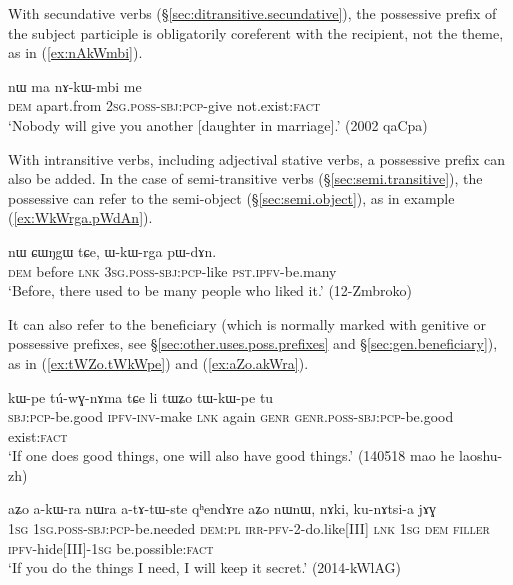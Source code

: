 With secundative verbs (§\ref{sec:ditransitive.secundative}), the possessive prefix of the subject participle is obligatorily coreferent with the recipient, not the theme, as in (\ref{ex:nAkWmbi}).

\begin{exe}
\ex \label{ex:nAkWmbi}
\gll nɯ ma nɤ-kɯ-mbi me \\
\textsc{dem} apart.from \textsc{2sg}.\textsc{poss}-\textsc{sbj}:\textsc{pcp}-give not.exist:\textsc{fact} \\
\glt `Nobody will give you another [daughter in marriage].' (2002 qaCpa)
\end{exe}
With intransitive verbs, including adjectival stative verbs, a possessive prefix can also be added. In the case of semi-transitive verbs (§\ref{sec:semi.transitive}), the possessive can refer to the semi-object (§\ref{sec:semi.object}), as in example (\ref{ex:WkWrga.pWdAn}).

 \begin{exe} 
\ex \label{ex:WkWrga.pWdAn}
\gll  nɯ ɕɯŋgɯ tɕe, ɯ-kɯ-rga pɯ-dɤn. \\
\textsc{dem} before \textsc{lnk} \textsc{3sg}.\textsc{poss}-\textsc{sbj}:\textsc{pcp}-like \textsc{pst}.\textsc{ipfv}-be.many \\
\glt  `Before, there used to be many people who liked it.' (12-Zmbroko)
\end{exe}

It can also refer to the beneficiary (which is normally marked with genitive or possessive prefixes, see §\ref{sec:other.uses.poss.prefixes} and §\ref{sec:gen.beneficiary}), as in (\ref{ex:tWZo.tWkWpe}) and (\ref{ex:aZo.akWra}).

 \begin{exe} 
\ex \label{ex:tWZo.tWkWpe}
\gll  kɯ-pe tú-wɣ-nɤma tɕe li tɯʑo tɯ-kɯ-pe tu \\
\textsc{sbj}:\textsc{pcp}-be.good \textsc{ipfv}-\textsc{inv}-make \textsc{lnk} again \textsc{genr} \textsc{genr}.\textsc{poss}-\textsc{sbj}:\textsc{pcp}-be.good exist:\textsc{fact} \\
\glt  `If one does good things, one will also have good things.' (140518 mao he laoshu-zh)
\end{exe}

 \begin{exe} 
\ex \label{ex:aZo.akWra}
\gll  aʑo a-kɯ-ra nɯra a-tɤ-tɯ-ste qʰendɤre aʑo nɯnɯ, nɤki, ku-nɤtsi-a jɤɣ \\
\textsc{1sg} \textsc{1sg}.\textsc{poss}-\textsc{sbj}:\textsc{pcp}-be.needed \textsc{dem}:\textsc{pl} \textsc{irr}-\textsc{pfv}-2-do.like[III] \textsc{lnk} \textsc{1sg} \textsc{dem} \textsc{filler} \textsc{ipfv}-hide[III]-\textsc{1sg} be.possible:\textsc{fact}  \\
\glt  `If you do the things I need, I will keep it secret.'  (2014-kWlAG)
\end{exe}

